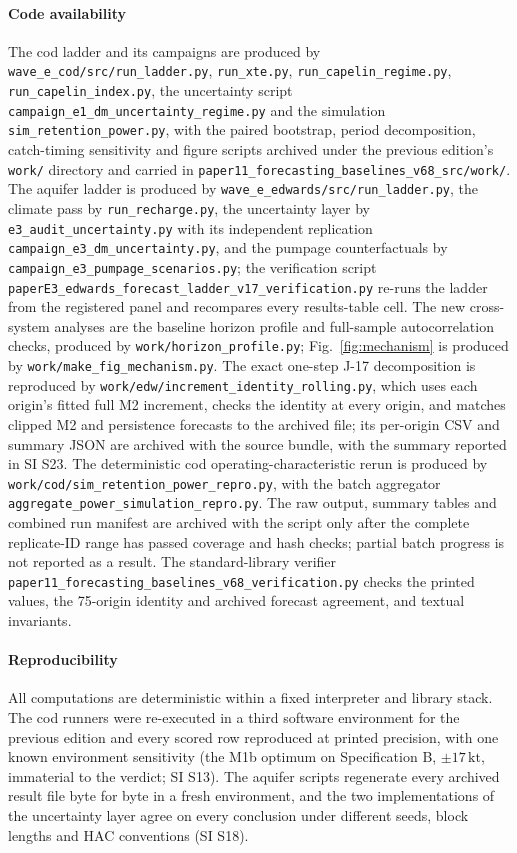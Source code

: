 \documentclass[preprint,11pt,authoryear]{elsarticle}
\theoremstyle{definition}
\theoremstyle{remark}
\newcommand{\kt}{\,\mathrm{kt}}
\begin{document}
\paragraph{Code availability} The cod ladder and its campaigns are produced by \texttt{wave\_e\_cod/src/run\_ladder.py}, \texttt{run\_xte.py}, \texttt{run\_capelin\_regime.py}, \texttt{run\_capelin\_index.py}, the uncertainty script \texttt{campaign\_e1\_dm\_uncertainty\_regime.py} and the simulation \texttt{sim\_retention\_power.py}, with the paired bootstrap, period decomposition, catch-timing sensitivity and figure scripts archived under the previous edition's \texttt{work/} directory and carried in \texttt{paper11\_forecasting\_baselines\_v68\_src/work/}. The aquifer ladder is produced by \texttt{wave\_e\_edwards/src/run\_ladder.py}, the climate pass by \texttt{run\_recharge.py}, the uncertainty layer by \texttt{e3\_audit\_uncertainty.py} with its independent replication \texttt{campaign\_e3\_dm\_uncertainty.py}, and the pumpage counterfactuals by \texttt{campaign\_e3\_pumpage\_scenarios.py}; the verification script \texttt{paperE3\_edwards\_forecast\_ladder\_v17\_verification.py} re-runs the ladder from the registered panel and recompares every results-table cell. The new cross-system analyses are the baseline horizon profile and full-sample autocorrelation checks, produced by \texttt{work/horizon\_profile.py}; Fig.~\ref{fig:mechanism} is produced by \texttt{work/make\_fig\_mechanism.py}. The exact one-step J-17 decomposition is reproduced by \texttt{work/edw/increment\_identity\_rolling.py}, which uses each origin's fitted full M2 increment, checks the identity at every origin, and matches clipped M2 and persistence forecasts to the archived file; its per-origin CSV and summary JSON are archived with the source bundle, with the summary reported in SI S23. The deterministic cod operating-characteristic rerun is produced by \texttt{work/cod/sim\_retention\_power\_repro.py}, with the batch aggregator \texttt{aggregate\_power\_simulation\_repro.py}. The raw output, summary tables and combined run manifest are archived with the script only after the complete replicate-ID range has passed coverage and hash checks; partial batch progress is not reported as a result. The standard-library verifier \texttt{paper11\_forecasting\_baselines\_v68\_verification.py} checks the printed values, the 75-origin identity and archived forecast agreement, and textual invariants.

\paragraph{Reproducibility} All computations are deterministic within a fixed interpreter and library stack. The cod runners were re-executed in a third software environment for the previous edition and every scored row reproduced at printed precision, with one known environment sensitivity (the M1b optimum on Specification B, $\pm17\kt$, immaterial to the verdict; SI S13). The aquifer scripts regenerate every archived result file byte for byte in a fresh environment, and the two implementations of the uncertainty layer agree on every conclusion under different seeds, block lengths and HAC conventions (SI S18).
\end{document}
